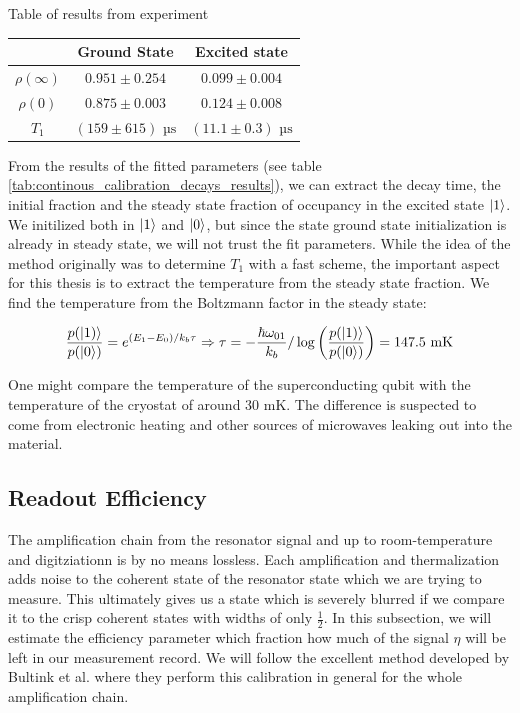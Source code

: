 \begin{margintable}[3 cm]
    \centering
    \caption{Table of results from experiment}
    \begin{tabular}{c|cc}
        & Ground State & Excited state \\
        \hline
        $\rho(\infty)$&$0.951 \pm 0.254$&$0.099 \pm 0.004$ \\
        $\rho(0)$&$0.875 \pm 0.003$&$0.124 \pm 0.008$\\
        $T_1$ &$(159 \pm 615) \text{ µs}$&$(11.1 \pm 0.3)  \text{ µs}$\\
    \end{tabular}
    \label{tab:continous_calibration_decays_results}
\end{margintable}
From the results of the fitted parameters (see table \ref{tab:continous_calibration_decays_results}), we can extract the decay time, the initial fraction and the steady state fraction of occupancy in the excited state $\ket{1}$. We initilized both in $\ket{1}$ and $\ket{0}$, but since the state ground state initialization is already in steady state, we will not trust the fit parameters. While the idea of the method originally was to determine $T_1$ with a fast scheme, the important aspect for this thesis is to extract the temperature from the steady state fraction. We find the temperature from the Boltzmann factor in the steady state:
\begin{fullwidth}
\begin{equation}
    \frac{p(\ket{1)}}{p(\ket{0})} = e^{(E_1 - E_0) / k_b \tau} \Rightarrow \tau = - \frac{\hbar \omega_{01}}{k_b} / \log\left(\frac{p(\ket{1)}}{p(\ket{0})} \right)  = 147.5 \text{ mK}
\end{equation}
\end{fullwidth}
One might compare the temperature of the superconducting qubit with the temperature of the cryostat of around 30 mK. The difference is suspected to come from electronic heating and other sources of microwaves leaking out into the material.

\subsection{Readout Efficiency}\label{sec:readout_efficiency}
The amplification chain from the resonator signal and up to room-temperature and digitziationn is by no means lossless. Each amplification and thermalization adds noise to the coherent state of the resonator state which we are trying to measure. This ultimately gives us a state which is severely blurred if we compare it to the crisp coherent states with widths of only $\frac12$. In this subsection, we will estimate the efficiency parameter which fraction how much of the signal $\eta$ will be left in our measurement record. We will follow the excellent method developed by Bultink et al. \cite{bultink_general_2018} where they perform this calibration in general for the whole amplification chain.

